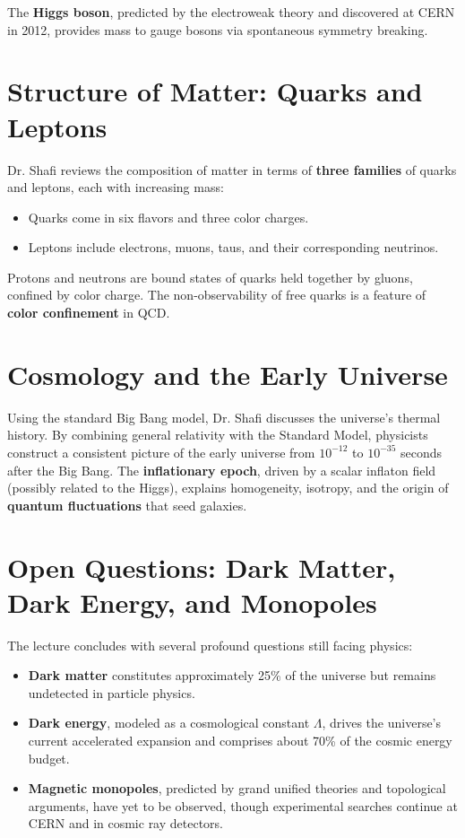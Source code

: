 \documentclass[12pt]{article}
\begin{document}
The \textbf{Higgs boson}, predicted by the electroweak theory and discovered at CERN in 2012, provides mass to gauge bosons via spontaneous symmetry breaking.

\section*{Structure of Matter: Quarks and Leptons}
Dr. Shafi reviews the composition of matter in terms of \textbf{three families} of quarks and leptons, each with increasing mass:
\begin{itemize}
    \item Quarks come in six flavors and three color charges.
    \item Leptons include electrons, muons, taus, and their corresponding neutrinos.
\end{itemize}

Protons and neutrons are bound states of quarks held together by gluons, confined by color charge. The non-observability of free quarks is a feature of \textbf{color confinement} in QCD.

\section*{Cosmology and the Early Universe}
Using the standard Big Bang model, Dr. Shafi discusses the universe’s thermal history. By combining general relativity with the Standard Model, physicists construct a consistent picture of the early universe from \( 10^{-12} \) to \( 10^{-35} \) seconds after the Big Bang. The \textbf{inflationary epoch}, driven by a scalar inflaton field (possibly related to the Higgs), explains homogeneity, isotropy, and the origin of \textbf{quantum fluctuations} that seed galaxies.

\section*{Open Questions: Dark Matter, Dark Energy, and Monopoles}
The lecture concludes with several profound questions still facing physics:
\begin{itemize}
    \item \textbf{Dark matter} constitutes approximately 25\% of the universe but remains undetected in particle physics.
    \item \textbf{Dark energy}, modeled as a cosmological constant \( \Lambda \), drives the universe’s current accelerated expansion and comprises about 70\% of the cosmic energy budget.
    \item \textbf{Magnetic monopoles}, predicted by grand unified theories and topological arguments, have yet to be observed, though experimental searches continue at CERN and in cosmic ray detectors.
\end{itemize}
\end{document}
